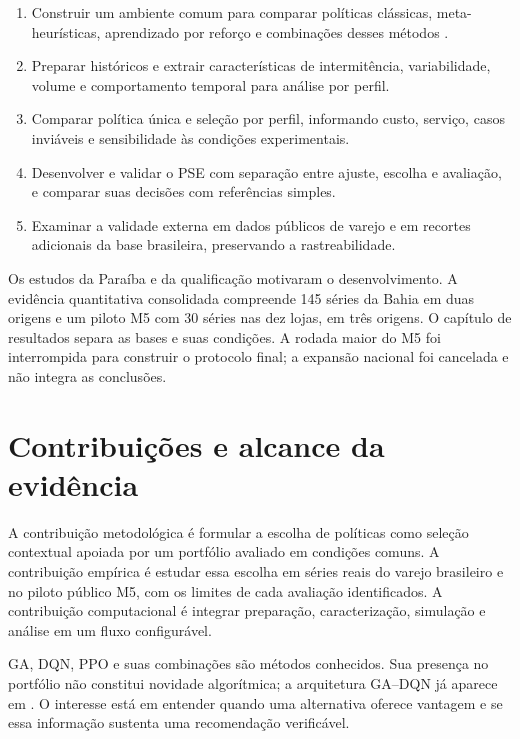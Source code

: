 \begin{enumerate}
  \item Construir um ambiente comum para comparar políticas clássicas, meta-heurísticas, aprendizado por reforço e combinações desses métodos \citep{Law2015SimulationModeling,Talbi2009Metaheuristics}.
  \item Preparar históricos e extrair características de intermitência, variabilidade, volume e comportamento temporal para análise por perfil.
  \item Comparar política única e seleção por perfil, informando custo, serviço, casos inviáveis e sensibilidade às condições experimentais.
  \item Desenvolver e validar o PSE com separação entre ajuste, escolha e avaliação, e comparar suas decisões com referências simples.
  \item Examinar a validade externa em dados públicos de varejo e em recortes adicionais da base brasileira, preservando a rastreabilidade.
\end{enumerate}

Os estudos da Paraíba e da qualificação motivaram o desenvolvimento. A evidência quantitativa consolidada compreende 145 séries da Bahia em duas origens e um piloto M5 com 30 séries nas dez lojas, em três origens. O capítulo de resultados separa as bases e suas condições. A rodada maior do M5 foi interrompida para construir o protocolo final; a expansão nacional foi cancelada e não integra as conclusões.

\section{Contribuições e alcance da evidência}

A contribuição metodológica é formular a escolha de políticas como seleção contextual apoiada por um portfólio avaliado em condições comuns. A contribuição empírica é estudar essa escolha em séries reais do varejo brasileiro e no piloto público M5, com os limites de cada avaliação identificados. A contribuição computacional é integrar preparação, caracterização, simulação e análise em um fluxo configurável.

GA, DQN, PPO e suas combinações são métodos conhecidos. Sua presença no portfólio não constitui novidade algorítmica; a arquitetura GA--DQN já aparece em \citet{Zabraoui2025GaDQN}. O interesse está em entender quando uma alternativa oferece vantagem e se essa informação sustenta uma recomendação verificável.

